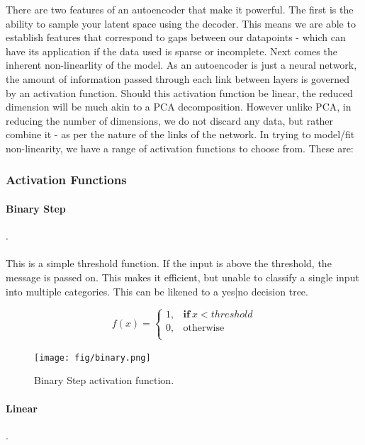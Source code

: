 \documentclass{pasa}%
\begin{document}
There are two features of an autoencoder that make it powerful. The first is the ability to sample your latent space using the decoder. This means we are able to establish features that correspond to gaps between our datapoints - which can have its application if the data used is sparse or incomplete. Next comes the inherent non-linearlity of the model. As an autoencoder is just a neural network, the amount of information passed through each link between layers is governed by an activation function. Should this activation function be linear, the reduced dimension will be much akin to a PCA decomposition. However unlike PCA, in reducing the number of dimensions, we do not discard any data, but rather combine it - as per the nature of the links of the network. In trying to model/fit non-linearity, we have a range of activation functions to choose from. These are:

\subsubsection{Activation Functions}

\paragraph{Binary Step}.\\\\
This is a simple threshold function. If the input is above the threshold, the message is passed on. This makes it efficient, but unable to classify a single input into multiple categories. This can be likened to a yes|no decision tree. 

\begin{equation}
f(x) = 
    \begin{cases}
      1 , & \mathbf{if} \ x < threshold \\
      0 , & \text{otherwise}\\
      
    \end{cases}
  \end{equation}

\begin{figure}[H]
\centering
\texttt{[image: fig/binary.png]}
\caption{Binary Step activation function.}
\end{figure}



\paragraph{Linear}.\\\\
\end{document}
